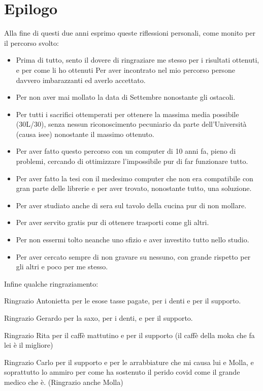 \appendix
\chapter{Epilogo}
\label{app:nomeAppendiceA}
\footnotesize{
Alla fine di questi due anni esprimo queste riflessioni personali, come monito per il percorso svolto:
\begin{itemize}
\item Prima di tutto, sento il dovere di ringraziare me stesso per i risultati ottenuti, e per come li ho ottenuti
Per aver incontrato nel mio percorso persone davvero imbarazzanti ed averlo accettato. 
\item Per non aver mai mollato la data di Settembre nonostante gli ostacoli. 
\item Per tutti i sacrifici ottemperati per ottenere la massima media possibile (30L/30), senza nessun riconoscimento pecuniario da parte dell’Università (causa isee) nonostante il massimo ottenuto. 
\item Per aver fatto questo percorso con un computer di 10 anni fa, pieno di problemi, cercando di ottimizzare l’impossibile pur di far funzionare tutto. 
\item Per aver fatto la tesi con il medesimo computer che non era compatibile con gran parte delle librerie e per aver trovato, nonostante tutto, una soluzione. 
\item Per aver studiato anche di sera sul tavolo della cucina pur di non mollare.
\item Per aver servito gratis pur di ottenere trasporti come gli altri. 
\item Per non essermi tolto neanche uno sfizio e aver investito tutto nello studio.
\item Per aver cercato sempre di non gravare su nessuno, con grande rispetto per gli altri e poco per me stesso. 
\end{itemize}
Infine qualche ringraziamento:

Ringrazio Antonietta per le esose tasse pagate, per i denti e per il supporto. 

Ringrazio Gerardo per la saxo, per i denti, e per il supporto. 

Ringrazio Rita per il caffè mattutino e per il supporto (il caffè della moka che fa lei è il migliore) 

Ringrazio Carlo per il supporto e per le arrabbiature che mi causa lui e Molla, e soprattutto lo ammiro per come ha sostenuto il perido covid come il grande medico che è. (Ringrazio anche Molla)  

}
